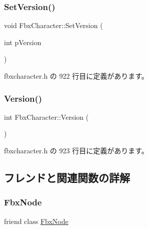 \mbox{\label{class_fbx_character_a551e6c63221243de69f196092f2cca04}} 
\subsubsection{\texorpdfstring{Set\+Version()}{SetVersion()}}
{\footnotesize\ttfamily void Fbx\+Character\+::\+Set\+Version (\begin{DoxyParamCaption}\item[{int}]{p\+Version }\end{DoxyParamCaption})\hspace{0.3cm}{\ttfamily [inline]}}



 fbxcharacter.\+h の 922 行目に定義があります。

\mbox{\label{class_fbx_character_ac043c84d80802eb45a29745d20fbd2a0}} 
\subsubsection{\texorpdfstring{Version()}{Version()}}
{\footnotesize\ttfamily int Fbx\+Character\+::\+Version (\begin{DoxyParamCaption}{ }\end{DoxyParamCaption})\hspace{0.3cm}{\ttfamily [inline]}}



 fbxcharacter.\+h の 923 行目に定義があります。



\subsection{フレンドと関連関数の詳解}
\mbox{\label{class_fbx_character_a7b27a89b3d5b45cd1a28960c77e4880b}} 
\subsubsection{\texorpdfstring{Fbx\+Node}{FbxNode}}
{\footnotesize\ttfamily friend class \hyperlink{class_fbx_node}{Fbx\+Node}\hspace{0.3cm}{\ttfamily [friend]}}



